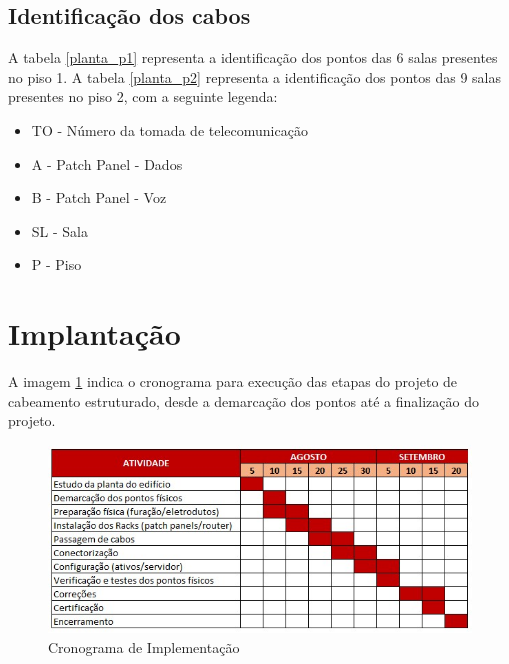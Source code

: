 \documentclass[	DIV=calc,%
							paper=a4,%
							fontsize=12pt,%
							onecolumn]{scrartcl}	 					%
\begin{document}

\FloatBarrier
\subsection{Identificação dos cabos}
A tabela \ref{planta_p1} representa a identificação dos pontos das 6 salas presentes no piso 1.
A tabela \ref{planta_p2} representa a identificação dos pontos das 9 salas presentes no piso 2, com a seguinte legenda:
\begin{itemize}
	\item TO - Número da tomada de telecomunicação
	\item A  - Patch Panel - Dados
	\item B  - Patch Panel - Voz
	\item SL - Sala 
	\item P  - Piso
\end{itemize}


\FloatBarrier

\FloatBarrier
\section{Implantação}
A imagem \ref{cron} indica o cronograma para execução das etapas do projeto de cabeamento estruturado, desde a demarcação dos pontos até a finalização do projeto.

\begin{figure}[h!]
	\centering
	\includegraphics[width=\textwidth]{cronograma}
	\caption{Cronograma de Implementação}
	\label{cron}
\end{figure}
\end{document}
